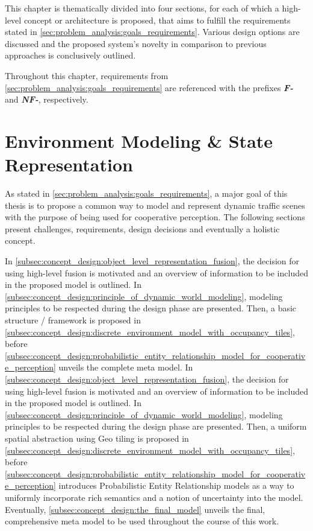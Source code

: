This chapter is thematically divided into four sections, for each of which a high-level concept or architecture is proposed, that aims to fulfill the requirements stated in \autoref{sec:problem_analysis:goals_requirements}. Various design options are discussed and the proposed system's novelty in comparison to previous approaches is conclusively outlined.

Throughout this chapter, requirements from \autoref{sec:problem_analysis:goals_requirements} are referenced with the prefixes \textit{\textbf{F-}} and \textit{\textbf{NF-}}, respectively.

\section{Environment Modeling \& State Representation}
\label{sec:concept_design:environment_modeling_state_representation}
As stated in \autoref{sec:problem_analysis:goals_requirements}, a major goal of this thesis is to propose a common way to model and represent dynamic traffic scenes with the purpose of being used for cooperative perception. The following sections present challenges, requirements, design decisions and eventually a holistic concept.

In \autoref{subsec:concept_design:object_level_representation_fusion}, the decision for using high-level fusion is motivated and an overview of information to be included in the proposed model is outlined. In \autoref{subsec:concept_design:principle_of_dynamic_world_modeling}, modeling principles to be respected during the design phase are presented. Then, a basic structure / framework is proposed in \autoref{subsec:concept_design:discrete_environment_model_with_occupancy_tiles}, before \autoref{subsec:concept_design:probabilistic_entity_relationship_model_for_cooperative_perception} unveils the complete meta model. 
In \autoref{subsec:concept_design:object_level_representation_fusion}, the decision for using high-level fusion is motivated and an overview of information to be included in the proposed model is outlined. In \autoref{subsec:concept_design:principle_of_dynamic_world_modeling}, modeling principles to be respected during the design phase are presented. Then, a uniform spatial abstraction using Geo tiling is proposed in \autoref{subsec:concept_design:discrete_environment_model_with_occupancy_tiles}, before \autoref{subsec:concept_design:probabilistic_entity_relationship_model_for_cooperative_perception} introduces Probabilistic Entity Relationship models as a way to uniformly incorporate rich semantics and a notion of uncertainty into the model. Eventually, \autoref{subsec:concept_design:the_final_model} unveils the final, comprehensive meta model to be used throughout the course of this work.


